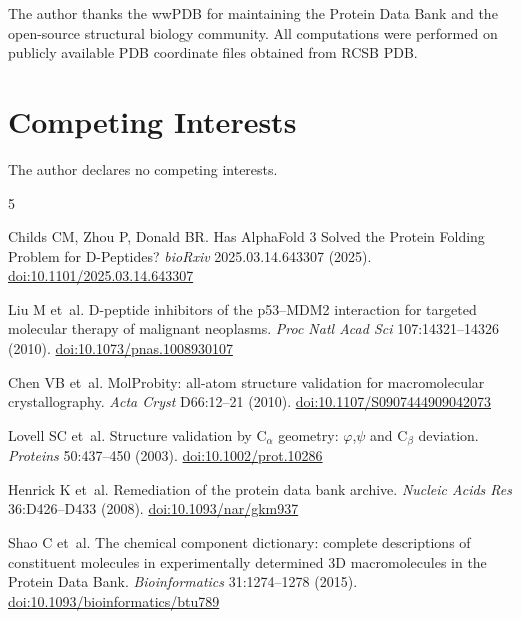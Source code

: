 \documentclass[11pt]{article}
\begin{document}
The author thanks the wwPDB for maintaining the Protein Data Bank and the open-source structural biology community. All computations were performed on publicly available PDB coordinate files obtained from RCSB PDB.

\section*{Competing Interests}

The author declares no competing interests.

\begin{thebibliography}{5}

Childs CM, Zhou P, Donald BR.
\newblock Has AlphaFold 3 Solved the Protein Folding Problem for D-Peptides?
\newblock \textit{bioRxiv} 2025.03.14.643307 (2025).
\newblock \href{https://doi.org/10.1101/2025.03.14.643307}{doi:10.1101/2025.03.14.643307}

Liu M et~al.
\newblock D-peptide inhibitors of the p53--MDM2 interaction for targeted molecular therapy of malignant neoplasms.
\newblock \textit{Proc Natl Acad Sci} 107:14321--14326 (2010).
\newblock \href{https://doi.org/10.1073/pnas.1008930107}{doi:10.1073/pnas.1008930107}

Chen VB et~al.
\newblock MolProbity: all-atom structure validation for macromolecular crystallography.
\newblock \textit{Acta Cryst} D66:12--21 (2010).
\newblock \href{https://doi.org/10.1107/S0907444909042073}{doi:10.1107/S0907444909042073}

Lovell SC et~al.
\newblock Structure validation by C$_\alpha$ geometry: $\varphi$,$\psi$ and C$_\beta$ deviation.
\newblock \textit{Proteins} 50:437--450 (2003).
\newblock \href{https://doi.org/10.1002/prot.10286}{doi:10.1002/prot.10286}

Henrick K et~al.
\newblock Remediation of the protein data bank archive.
\newblock \textit{Nucleic Acids Res} 36:D426--D433 (2008).
\newblock \href{https://doi.org/10.1093/nar/gkm937}{doi:10.1093/nar/gkm937}

Shao C et~al.
\newblock The chemical component dictionary: complete descriptions of constituent molecules in experimentally determined 3D macromolecules in the Protein Data Bank.
\newblock \textit{Bioinformatics} 31:1274--1278 (2015).
\newblock \href{https://doi.org/10.1093/bioinformatics/btu789}{doi:10.1093/bioinformatics/btu789}


\end{thebibliography}
\end{document}
